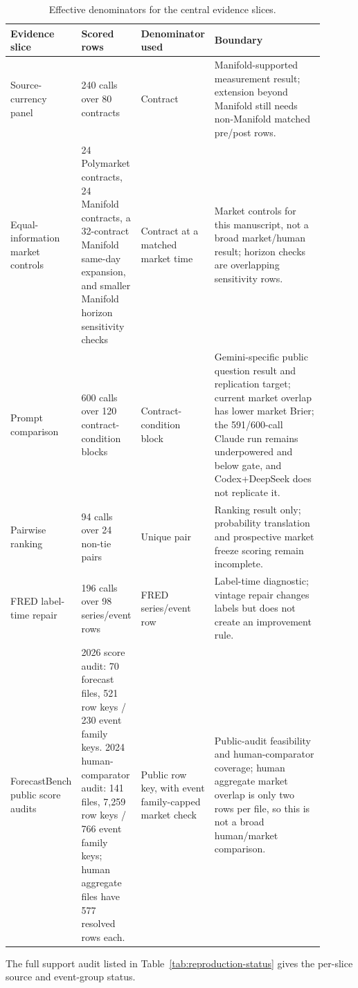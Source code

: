 \documentclass[11pt]{article}
\begin{document}
\begin{table}[p]
\centering
\begingroup
\setlength{\tabcolsep}{2.5pt}
\renewcommand{\arraystretch}{0.9}
\scriptsize
\begin{tabular}{@{}L{0.18\linewidth} L{0.18\linewidth} L{0.19\linewidth} L{0.35\linewidth}@{}}
\toprule
Evidence slice & Scored rows & Denominator used & Boundary \\
\midrule
Source-currency panel & 240 calls over 80 contracts & Contract & Manifold-supported measurement result; extension beyond Manifold still needs non-Manifold matched pre/post rows. \\
Equal-information market controls & 24 Polymarket contracts, 24 Manifold contracts, a 32-contract Manifold same-day expansion, and smaller Manifold horizon sensitivity checks & Contract at a matched market time & Market controls for this manuscript, not a broad market/human result; horizon checks are overlapping sensitivity rows. \\
Prompt comparison & 600 calls over 120 contract-condition blocks & Contract-condition block & Gemini-specific public question result and replication target; current market overlap has lower market Brier; the 591/600-call Claude run remains underpowered and below gate, and Codex+DeepSeek does not replicate it. \\
Pairwise ranking & 94 calls over 24 non-tie pairs & Unique pair & Ranking result only; probability translation and prospective market freeze scoring remain incomplete. \\
FRED label-time repair & 196 calls over 98 series/event rows & FRED series/event row & Label-time diagnostic; vintage repair changes labels but does not create an improvement rule. \\
ForecastBench public score audits & 2026 score audit: 70 forecast files, 521 row keys / 230 event family keys. 2024 human-comparator audit: 141 files, 7{,}259 row keys / 766 event family keys; human aggregate files have 577 resolved rows each. & Public row key, with event family-capped market check & Public-audit feasibility and human-comparator coverage; human aggregate market overlap is only two rows per file, so this is not a broad human/market comparison. \\
\bottomrule
\end{tabular}
\endgroup
\caption{Effective denominators for the central evidence slices.}
\label{tab:effective-denominators}
\end{table}

The full support audit listed in Table~\ref{tab:reproduction-status} gives the per-slice source and event-group status.
\end{document}
